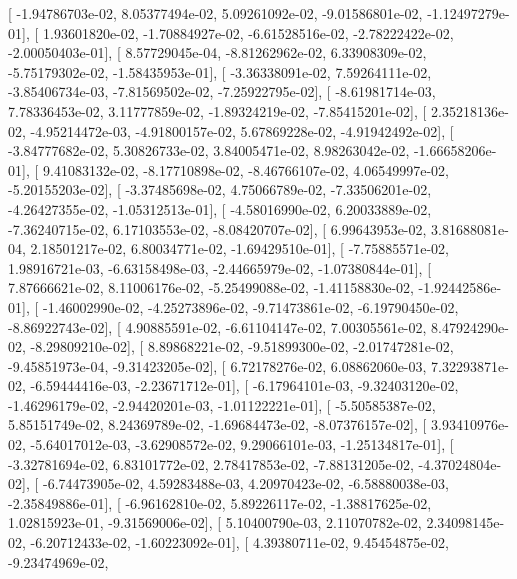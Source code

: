 \documentclass{article}
\begin{document}
       [ -1.94786703e-02,   8.05377494e-02,   5.09261092e-02,
         -9.01586801e-02,  -1.12497279e-01],
       [  1.93601820e-02,  -1.70884927e-02,  -6.61528516e-02,
         -2.78222422e-02,  -2.00050403e-01],
       [  8.57729045e-04,  -8.81262962e-02,   6.33908309e-02,
         -5.75179302e-02,  -1.58435953e-01],
       [ -3.36338091e-02,   7.59264111e-02,  -3.85406734e-03,
         -7.81569502e-02,  -7.25922795e-02],
       [ -8.61981714e-03,   7.78336453e-02,   3.11777859e-02,
         -1.89324219e-02,  -7.85415201e-02],
       [  2.35218136e-02,  -4.95214472e-03,  -4.91800157e-02,
          5.67869228e-02,  -4.91942492e-02],
       [ -3.84777682e-02,   5.30826733e-02,   3.84005471e-02,
          8.98263042e-02,  -1.66658206e-01],
       [  9.41083132e-02,  -8.17710898e-02,  -8.46766107e-02,
          4.06549997e-02,  -5.20155203e-02],
       [ -3.37485698e-02,   4.75066789e-02,  -7.33506201e-02,
         -4.26427355e-02,  -1.05312513e-01],
       [ -4.58016990e-02,   6.20033889e-02,  -7.36240715e-02,
          6.17103553e-02,  -8.08420707e-02],
       [  6.99643953e-02,   3.81688081e-04,   2.18501217e-02,
          6.80034771e-02,  -1.69429510e-01],
       [ -7.75885571e-02,   1.98916721e-03,  -6.63158498e-03,
         -2.44665979e-02,  -1.07380844e-01],
       [  7.87666621e-02,   8.11006176e-02,  -5.25499088e-02,
         -1.41158830e-02,  -1.92442586e-01],
       [ -1.46002990e-02,  -4.25273896e-02,  -9.71473861e-02,
         -6.19790450e-02,  -8.86922743e-02],
       [  4.90885591e-02,  -6.61104147e-02,   7.00305561e-02,
          8.47924290e-02,  -8.29809210e-02],
       [  8.89868221e-02,  -9.51899300e-02,  -2.01747281e-02,
         -9.45851973e-04,  -9.31423205e-02],
       [  6.72178276e-02,   6.08862060e-03,   7.32293871e-02,
         -6.59444416e-03,  -2.23671712e-01],
       [ -6.17964101e-03,  -9.32403120e-02,  -1.46296179e-02,
         -2.94420201e-03,  -1.01122221e-01],
       [ -5.50585387e-02,   5.85151749e-02,   8.24369789e-02,
         -1.69684473e-02,  -8.07376157e-02],
       [  3.93410976e-02,  -5.64017012e-03,  -3.62908572e-02,
          9.29066101e-03,  -1.25134817e-01],
       [ -3.32781694e-02,   6.83101772e-02,   2.78417853e-02,
         -7.88131205e-02,  -4.37024804e-02],
       [ -6.74473905e-02,   4.59283488e-03,   4.20970423e-02,
         -6.58880038e-03,  -2.35849886e-01],
       [ -6.96162810e-02,   5.89226117e-02,  -1.38817625e-02,
          1.02815923e-01,  -9.31569006e-02],
       [  5.10400790e-03,   2.11070782e-02,   2.34098145e-02,
         -6.20712433e-02,  -1.60223092e-01],
       [  4.39380711e-02,   9.45454875e-02,  -9.23474969e-02,
\end{document}
